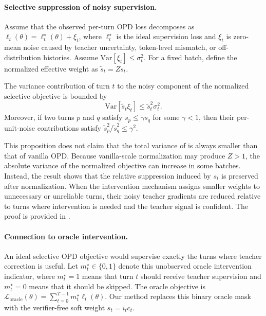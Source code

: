 \paragraph{Selective suppression of noisy supervision.}
Assume that the observed per-turn OPD loss decomposes as $\ell_t(\theta)=\ell_t^\star(\theta)+\xi_t$, where $\ell_t^\star$ is the ideal supervision loss and $\xi_t$ is zero-mean noise caused by teacher uncertainty, token-level mismatch, or off-distribution histories.
%
Assume $\mathrm{Var}[\xi_t]\leq\sigma_t^2$.
%
For a fixed batch, define the normalized effective weight as $\widetilde{s}_t=Zs_t$.

\begin{proposition}
\label{prop:relative_suppression}
The variance contribution of turn $t$ to the noisy component of the normalized selective objective is bounded by
\begin{equation}
\label{eq:noise_bound}
\mathrm{Var}[\widetilde{s}_t\xi_t]
\leq
\widetilde{s}_t^2\sigma_t^2 .
\end{equation}
Moreover, if two turns $p$ and $q$ satisfy $s_p\leq\gamma s_q$ for some $\gamma<1$, then their per-unit-noise contributions satisfy $\widetilde{s}_p^2/\widetilde{s}_q^2\leq\gamma^2$.
\end{proposition}

This proposition does not claim that the total variance of \ours{} is always smaller than that of vanilla OPD.
%
Because vanilla-scale normalization may produce $Z>1$, the absolute variance of the normalized objective can increase in some batches.
%
Instead, the result shows that the relative suppression induced by $s_t$ is preserved after normalization.
%
When the intervention mechanism assigns smaller weights to unnecessary or unreliable turns, their noisy teacher gradients are reduced relative to turns where intervention is needed and the teacher signal is confident.
%
The proof is provided in .

\paragraph{Connection to oracle intervention.}
An ideal selective OPD objective would supervise exactly the turns where teacher correction is useful.
%
Let $m_t^\star\in\{0,1\}$ denote this unobserved oracle intervention indicator, where $m_t^\star=1$ means that turn $t$ should receive teacher supervision and $m_t^\star=0$ means that it should be skipped.
%
The oracle objective is $\mathcal{L}_{\mathrm{oracle}}(\theta)=\sum_{t=0}^{T-1}m_t^\star\ell_t(\theta)$.
%
Our method replaces this binary oracle mask with the verifier-free soft weight $s_t=i_tc_t$.

